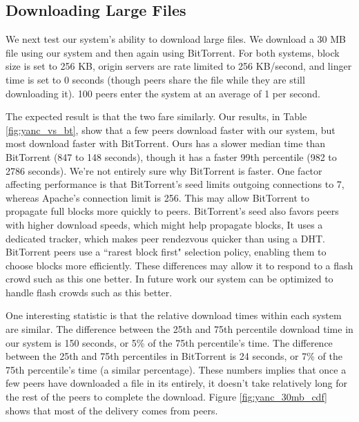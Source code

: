 \subsection{Downloading Large Files}

We next test our system's ability to download large files. We download a 30 MB file using our system and then again using BitTorrent.
For both systems, block size is set to 256 KB, origin servers are rate limited to 256 KB/second, and linger time 
is set to 0 seconds (though peers share the file while they are still downloading it). 100 peers enter the system at an average of 1 per second.  

The expected result is that the two fare similarly.  Our results, in Table \ref{fig:yanc_vs_bt}, show that a few peers download 
faster with our system, but most download faster with BitTorrent. 
Ours has a slower median time than BitTorrent (847 to 148 seconds), though it has a faster 99th
percentile (982 to 2786 seconds). We're not entirely sure why BitTorrent is faster.  
One factor affecting performance is that BitTorrent's seed limits outgoing connections to 7, whereas Apache's connection limit is 256.
This may allow BitTorrent to propagate full blocks more quickly to peers.  BitTorrent's seed also favors peers with higher download 
speeds, which might help propagate blocks,  It uses a dedicated tracker, 
which makes peer rendezvous quicker than using a DHT.  BitTorrent peers use a ``rarest block first" selection policy, enabling them to choose blocks more efficiently.  
These differences may allow it to respond to a flash crowd such as this one better.  In future work our system can be optimized to handle flash crowds such as this better.

One interesting statistic is that the relative download times within each system are similar.
The difference between the 25th and 75th percentile download time in our system is 150 seconds, 
or 5\% of the 75th percentile's time. The difference between the 25th and 75th percentiles in BitTorrent 
is 24 seconds, or 7\% of the 75th percentile's time (a similar percentage). These numbers implies that once 
a few peers have downloaded a file in its entirely, it doesn't take relatively long for the rest of the peers to complete 
the download.  Figure \ref{fig:yanc_30mb_cdf} shows that most of the delivery comes from peers.

